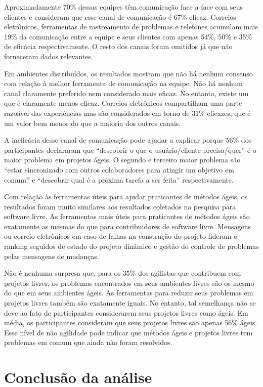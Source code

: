 Aproximadamente 70\% dessas equipes têm comunicação face a face com
seus clientes e consideram que esse canal de comunicação é 67\%
eficaz. Correios eletrônicos, ferramentas de rastreamento de problemas
e telefones acumulam mais 19\% da comunicação entre a equipe e seus
clientes com apenas 54\%, 50\% e 35\% de eficácia respectivamente. O
resto dos canais foram omitidos já que não forneceram dados
relevantes.

Em ambientes distribuídos, os resultados mostram que não há nenhum
consenso com relação à melhor ferramenta de comunicação na equipe. Não
há nenhum canal claramente preferido nem considerado mais eficaz. No
entanto, existe um que é claramente menos eficaz. Correios eletrônicos
compartilham uma parte razoável das experiências mas são considerados
em torno de 31\% eficazes, que é um valor bem menor do que a maioria
dos outros canais.

A ineficácia desse canal de comunicação pode ajudar a explicar porque
56\% dos participantes declararam que ``descobrir o que o
usuário/cliente precisa/quer'' é o maior problema em projetos ágeis. O
segundo e terceiro maior problema são ``estar sincronizado com outros
colaboradores para atingir um objetivo em comum'' e ``descobrir qual é
a próxima tarefa a ser feita'' respectivamente.

Com relação às ferramentas úteis para ajudar praticantes de métodos
ágeis, os resultados foram muito similares aos resultados coletados na
pesquisa para software livre. As ferramentas mais úteis para
praticantes de métodos ágeis são exatamente as mesmas do que para
contribuidores de software livre. Mensagens ou correio eletrônicos em
caso de falhas na construção do projeto lideram o ranking seguidos de
estado do projeto dinâmico e gestão do controle de problemas pelas
mensagens de mudanças.

Não é nenhuma surpresa que, para os 35\% dos agilistas que contribuem
com projetos livres, os problemas encontrados em seus ambientes livres
são os mesmo do que em seus ambientes ágeis. As ferramentas para
reduzir seus problemas em projetos livres também são exatamente
iguais. No entanto, tal semelhança não se deve ao fato de
participantes considerarem seus projetos livres como ágeis. Em média,
os participantes consideram que seus projetos livres são apenas 56\%
ágeis. Esse nível de não agilidade pode indicar que métodos ágeis e
projetos livres tem problemas em comum que ainda não foram resolvidos.

\section{Conclusão da análise}
\label{sec:proposta}

